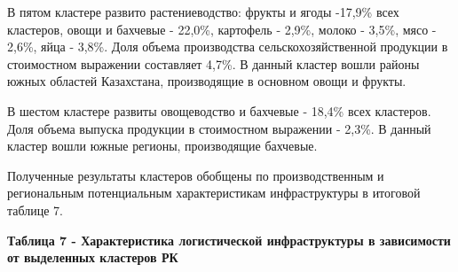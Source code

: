 В пятом кластере развито растениеводство: фрукты и ягоды -17,9\% всех
кластеров, овощи и бахчевые - 22,0\%, картофель - 2,9\%, молоко - 3,5\%,
мясо - 2,6\%, яйца - 3,8\%. Доля объема производства
сельскохозяйственной продукции в стоимостном выражении составляет 4,7\%.
В данный кластер вошли районы южных областей Казахстана, производящие в
основном овощи и фрукты.

В шестом кластере развиты овощеводство и бахчевые - 18,4\% всех
кластеров. Доля объема выпуска продукции в стоимостном выражении -
2,3\%. В данный кластер вошли южные регионы, производящие бахчевые.

Полученные результаты кластеров обобщены по производственным и
региональным потенциальным характеристикам инфраструктуры в итоговой
таблице 7.

{\bfseries Таблица 7 - Характеристика логистической инфраструктуры в
зависимости от выделенных кластеров РК}

